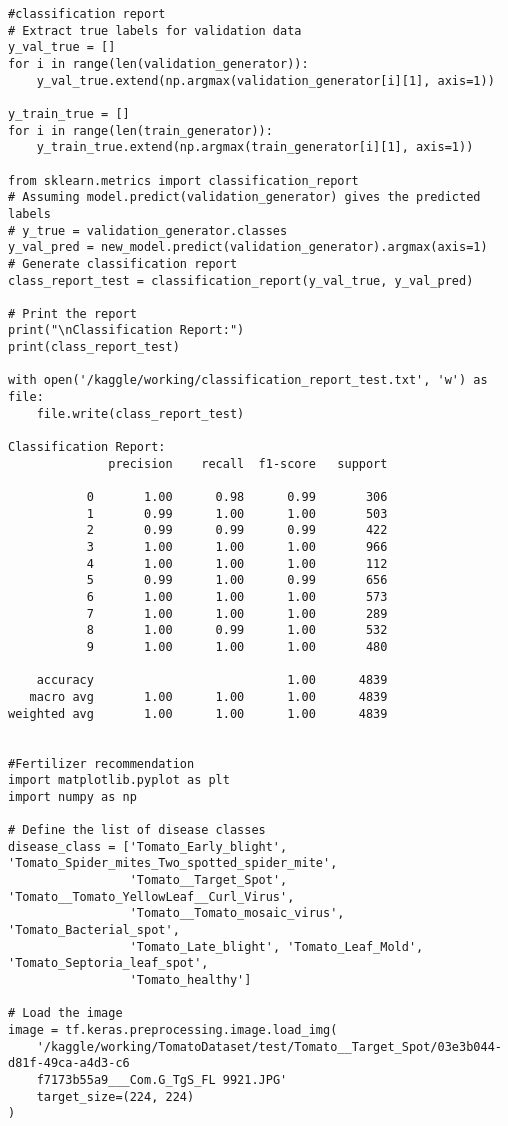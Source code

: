 \documentclass[12pt, English]{article}
\begin{document}
\begin{normalsize}
\begin{verbatim}
#classification report
# Extract true labels for validation data
y_val_true = []
for i in range(len(validation_generator)):
    y_val_true.extend(np.argmax(validation_generator[i][1], axis=1))

y_train_true = []
for i in range(len(train_generator)):
    y_train_true.extend(np.argmax(train_generator[i][1], axis=1))

from sklearn.metrics import classification_report
# Assuming model.predict(validation_generator) gives the predicted labels
# y_true = validation_generator.classes
y_val_pred = new_model.predict(validation_generator).argmax(axis=1)
# Generate classification report
class_report_test = classification_report(y_val_true, y_val_pred)

# Print the report
print("\nClassification Report:")
print(class_report_test)

with open('/kaggle/working/classification_report_test.txt', 'w') as file:
    file.write(class_report_test)

Classification Report:
              precision    recall  f1-score   support

           0       1.00      0.98      0.99       306
           1       0.99      1.00      1.00       503
           2       0.99      0.99      0.99       422
           3       1.00      1.00      1.00       966
           4       1.00      1.00      1.00       112
           5       0.99      1.00      0.99       656
           6       1.00      1.00      1.00       573
           7       1.00      1.00      1.00       289
           8       1.00      0.99      1.00       532
           9       1.00      1.00      1.00       480

    accuracy                           1.00      4839
   macro avg       1.00      1.00      1.00      4839
weighted avg       1.00      1.00      1.00      4839


#Fertilizer recommendation
import matplotlib.pyplot as plt
import numpy as np

# Define the list of disease classes
disease_class = ['Tomato_Early_blight', 'Tomato_Spider_mites_Two_spotted_spider_mite',
                 'Tomato__Target_Spot', 'Tomato__Tomato_YellowLeaf__Curl_Virus',
                 'Tomato__Tomato_mosaic_virus', 'Tomato_Bacterial_spot',
                 'Tomato_Late_blight', 'Tomato_Leaf_Mold', 'Tomato_Septoria_leaf_spot',
                 'Tomato_healthy']

# Load the image
image = tf.keras.preprocessing.image.load_img(
    '/kaggle/working/TomatoDataset/test/Tomato__Target_Spot/03e3b044-d81f-49ca-a4d3-c6
    f7173b55a9___Com.G_TgS_FL 9921.JPG'
    target_size=(224, 224)
)


\end{verbatim}
\end{normalsize}
\end{document}
